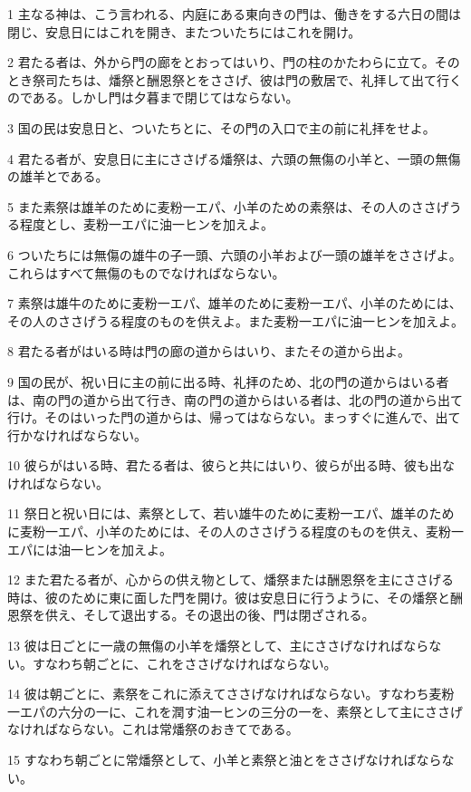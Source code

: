 \par 1 主なる神は、こう言われる、内庭にある東向きの門は、働きをする六日の間は閉じ、安息日にはこれを開き、またついたちにはこれを開け。
\par 2 君たる者は、外から門の廊をとおってはいり、門の柱のかたわらに立て。そのとき祭司たちは、燔祭と酬恩祭とをささげ、彼は門の敷居で、礼拝して出て行くのである。しかし門は夕暮まで閉じてはならない。
\par 3 国の民は安息日と、ついたちとに、その門の入口で主の前に礼拝をせよ。
\par 4 君たる者が、安息日に主にささげる燔祭は、六頭の無傷の小羊と、一頭の無傷の雄羊とである。
\par 5 また素祭は雄羊のために麦粉一エパ、小羊のための素祭は、その人のささげうる程度とし、麦粉一エパに油一ヒンを加えよ。
\par 6 ついたちには無傷の雄牛の子一頭、六頭の小羊および一頭の雄羊をささげよ。これらはすべて無傷のものでなければならない。
\par 7 素祭は雄牛のために麦粉一エパ、雄羊のために麦粉一エパ、小羊のためには、その人のささげうる程度のものを供えよ。また麦粉一エパに油一ヒンを加えよ。
\par 8 君たる者がはいる時は門の廊の道からはいり、またその道から出よ。
\par 9 国の民が、祝い日に主の前に出る時、礼拝のため、北の門の道からはいる者は、南の門の道から出て行き、南の門の道からはいる者は、北の門の道から出て行け。そのはいった門の道からは、帰ってはならない。まっすぐに進んで、出て行かなければならない。
\par 10 彼らがはいる時、君たる者は、彼らと共にはいり、彼らが出る時、彼も出なければならない。
\par 11 祭日と祝い日には、素祭として、若い雄牛のために麦粉一エパ、雄羊のために麦粉一エパ、小羊のためには、その人のささげうる程度のものを供え、麦粉一エパには油一ヒンを加えよ。
\par 12 また君たる者が、心からの供え物として、燔祭または酬恩祭を主にささげる時は、彼のために東に面した門を開け。彼は安息日に行うように、その燔祭と酬恩祭を供え、そして退出する。その退出の後、門は閉ざされる。
\par 13 彼は日ごとに一歳の無傷の小羊を燔祭として、主にささげなければならない。すなわち朝ごとに、これをささげなければならない。
\par 14 彼は朝ごとに、素祭をこれに添えてささげなければならない。すなわち麦粉一エパの六分の一に、これを潤す油一ヒンの三分の一を、素祭として主にささげなければならない。これは常燔祭のおきてである。
\par 15 すなわち朝ごとに常燔祭として、小羊と素祭と油とをささげなければならない。
